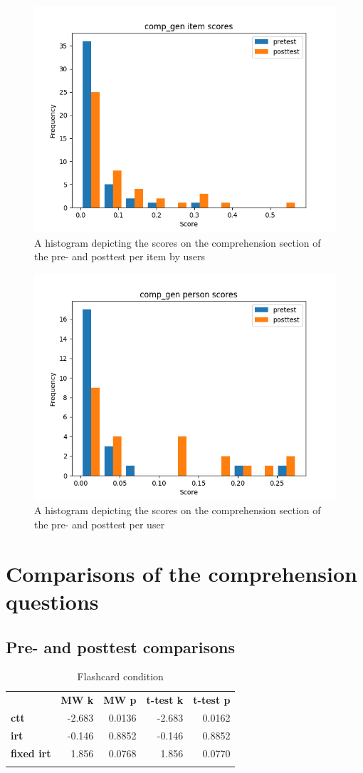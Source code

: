 \begin{figure}
    \centering
    \includegraphics[width=.7\textwidth]{img/comp_gen_diff.png}
    \caption{A histogram depicting the scores on the comprehension section of the pre- and posttest per item by users}
    \label{fig:comp_gen_diff}
\end{figure}
\begin{figure}
    \centering
    \includegraphics[width=.7\textwidth]{img/comp_gen_abil.png}
    \caption{A histogram depicting the scores on the comprehension section of the pre- and posttest per user}
    \label{fig:comp_gen_abil}
\end{figure}

\section{Comparisons of the comprehension questions}

\subsection{Pre- and posttest comparisons}

\begin{longtable}[c]{@{}lrrrr@{}}
\caption{Flashcard condition}
\endfirsthead
\endhead
\toprule\addlinespace
& \textbf{MW k} & \textbf{MW p} &
\textbf{t-test k} & \textbf{t-test p}
\\\addlinespace
\midrule
\textbf{ctt} & -2.683 & 0.0136 & -2.683 & 0.0162
\\\addlinespace
\textbf{irt} & -0.146 & 0.8852 & -0.146 & 0.8852
\\\addlinespace
\textbf{fixed irt} & 1.856 & 0.0768 & 1.856 & 0.0770
\\\addlinespace
\bottomrule
    \label{tab:comp_pp_fc_comp}
\end{longtable}


